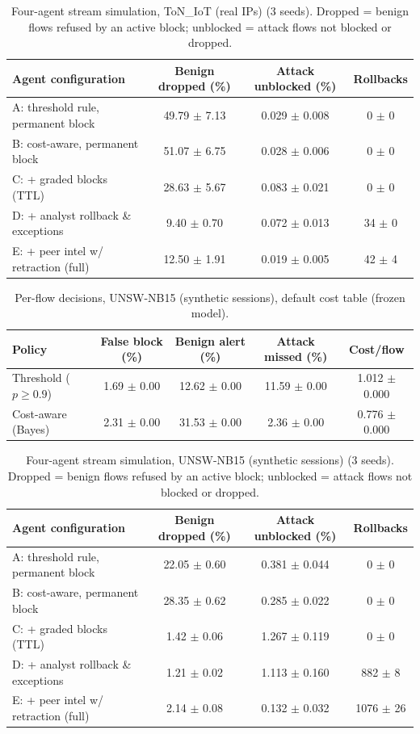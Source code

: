 \begin{table}[t]\centering
\caption{Four-agent stream simulation, ToN\_IoT (real IPs) (3 seeds). Dropped = benign flows refused by an active block; unblocked = attack flows not blocked or dropped.}
\label{tab:agent_ton}
\begin{tabular}{lccc}\toprule
Agent configuration & Benign dropped (\%) & Attack unblocked (\%) & Rollbacks \\ \midrule
A: threshold rule, permanent block & 49.79 $\pm$ 7.13 & 0.029 $\pm$ 0.008 & 0 $\pm$ 0 \\
B: cost-aware, permanent block & 51.07 $\pm$ 6.75 & 0.028 $\pm$ 0.006 & 0 $\pm$ 0 \\
C: + graded blocks (TTL) & 28.63 $\pm$ 5.67 & 0.083 $\pm$ 0.021 & 0 $\pm$ 0 \\
D: + analyst rollback \& exceptions & 9.40 $\pm$ 0.70 & 0.072 $\pm$ 0.013 & 34 $\pm$ 0 \\
E: + peer intel w/ retraction (full) & 12.50 $\pm$ 1.91 & 0.019 $\pm$ 0.005 & 42 $\pm$ 4 \\
\bottomrule\end{tabular}\end{table}

\begin{table}[t]\centering
\caption{Per-flow decisions, UNSW-NB15 (synthetic sessions), default cost table (frozen model).}
\label{tab:policy_unsw}
\begin{tabular}{lcccc}\toprule
Policy & False block (\%) & Benign alert (\%) & Attack missed (\%) & Cost/flow \\ \midrule
Threshold ($p\geq0.9$) & 1.69 $\pm$ 0.00 & 12.62 $\pm$ 0.00 & 11.59 $\pm$ 0.00 & 1.012 $\pm$ 0.000 \\
Cost-aware (Bayes) & 2.31 $\pm$ 0.00 & 31.53 $\pm$ 0.00 & 2.36 $\pm$ 0.00 & 0.776 $\pm$ 0.000 \\
\bottomrule\end{tabular}\end{table}

\begin{table}[t]\centering
\caption{Four-agent stream simulation, UNSW-NB15 (synthetic sessions) (3 seeds). Dropped = benign flows refused by an active block; unblocked = attack flows not blocked or dropped.}
\label{tab:agent_unsw}
\begin{tabular}{lccc}\toprule
Agent configuration & Benign dropped (\%) & Attack unblocked (\%) & Rollbacks \\ \midrule
A: threshold rule, permanent block & 22.05 $\pm$ 0.60 & 0.381 $\pm$ 0.044 & 0 $\pm$ 0 \\
B: cost-aware, permanent block & 28.35 $\pm$ 0.62 & 0.285 $\pm$ 0.022 & 0 $\pm$ 0 \\
C: + graded blocks (TTL) & 1.42 $\pm$ 0.06 & 1.267 $\pm$ 0.119 & 0 $\pm$ 0 \\
D: + analyst rollback \& exceptions & 1.21 $\pm$ 0.02 & 1.113 $\pm$ 0.160 & 882 $\pm$ 8 \\
E: + peer intel w/ retraction (full) & 2.14 $\pm$ 0.08 & 0.132 $\pm$ 0.032 & 1076 $\pm$ 26 \\
\bottomrule\end{tabular}\end{table}

